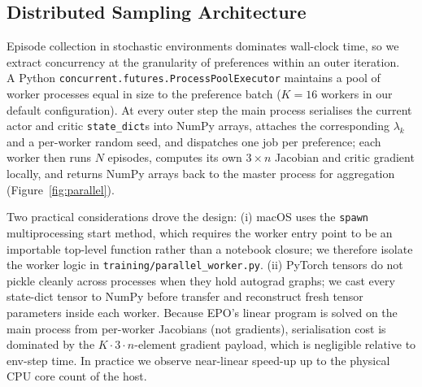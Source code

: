 \documentclass[12pt, letterpaper]{article}
\begin{document}
\subsection{Distributed Sampling Architecture}
\label{sec:method-parallel}
Episode collection in stochastic environments dominates wall-clock time, so we extract concurrency at the granularity of preferences within an outer iteration. \\
A Python \texttt{concurrent.futures.ProcessPoolExecutor} maintains a pool of worker processes equal in size to the preference batch ($K=16$ workers in our default configuration). At every outer step the main process serialises the current actor and critic \texttt{state\_dict}s into NumPy arrays, attaches the corresponding $\lambda_k$ and a per-worker random seed, and dispatches one job per preference; each worker then runs $N$ episodes, computes its own $3\times n$ Jacobian and critic gradient locally, and returns NumPy arrays back to the master process for aggregation (Figure~\ref{fig:parallel}).

Two practical considerations drove the design: (i) macOS uses the \texttt{spawn} multiprocessing start method, which requires the worker entry point to be an importable top-level function rather than a notebook closure; we therefore isolate the worker logic in \texttt{training/parallel\_worker.py}. (ii) PyTorch tensors do not pickle cleanly across processes when they hold autograd graphs; we cast every state-dict tensor to NumPy before transfer and reconstruct fresh tensor parameters inside each worker. Because EPO's linear program is solved on the main process from per-worker Jacobians (not gradients), serialisation cost is dominated by the $K \cdot 3 \cdot n$-element gradient payload, which is negligible relative to env-step time. In practice we observe near-linear speed-up up to the physical CPU core count of the host.
\end{document}
